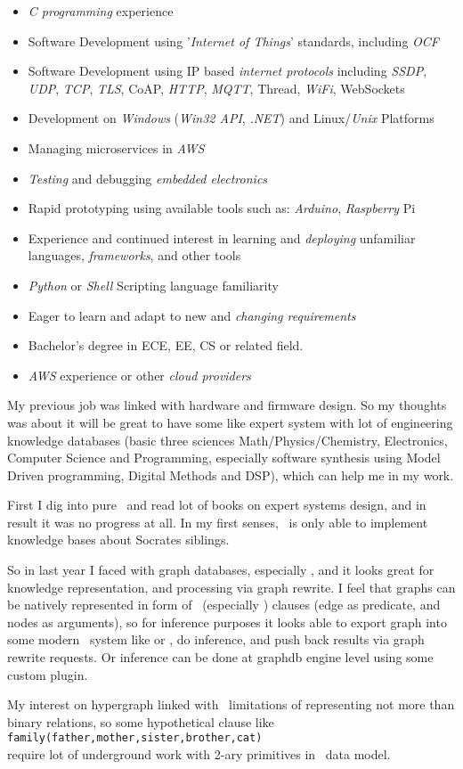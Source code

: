 \begin{framed}\noindent
\begin{itemize}[nosep,leftmargin=*]
\item \emph{C programming} experience
\item Software Development using '\emph{Internet of Things}' standards, including \emph{OCF}
\item Software Development using IP based \emph{internet protocols} including \emph{SSDP}, \emph{UDP}, \emph{TCP}, \emph{TLS}, CoAP, \emph{HTTP}, \emph{MQTT}, Thread, \emph{WiFi}, WebSockets
\item Development on \emph{Windows} (\emph{Win32 API}, \emph{.NET}) and Linux/\emph{Unix} Platforms
\item Managing microservices in \emph{AWS}
\item \emph{Testing} and debugging \emph{embedded electronics}
\item Rapid prototyping using available tools such as: \emph{Arduino}, \emph{Raspberry} Pi
\item Experience and continued interest in learning and \emph{deploying} unfamiliar languages, \emph{frameworks}, and other tools
\item \emph{Python} or \emph{Shell} Scripting language familiarity
\item Eager to learn and adapt to new and \emph{changing requirements}
\item Bachelor's degree in ECE, EE, CS or related field.
\item \emph{AWS} experience or other \emph{cloud providers}
\end{itemize}
\end{framed}

My previous job was linked with hardware and firmware design. So my thoughts was
about it will be great to have some  like expert system with
lot of engineering knowledge databases (basic three sciences
Math/Physics/Chemistry, Electronics, Computer Science and Programming,
especially software synthesis using Model Driven programming, Digital Methods
and DSP), which can help me in my work.

First I dig into pure \prolog\ and read lot of books on expert systems design,
and in result it was no progress at all. In my first senses, \prolog\ is only
able to implement knowledge bases about Socrates siblings.

So in last year I faced with graph databases, especially \neo, and it looks
great for knowledge representation, and processing via graph rewrite. I feel
that graphs can be natively represented in form of \prolog\ (especially
) clauses (edge as
predicate, and nodes as arguments), so for inference purposes it looks able to
export graph into some modern \prolog\ system like
 or \xsb, do inference,
and push back results via graph rewrite requests. Or inference can be done at
graphdb engine level using some custom plugin.

My interest on hypergraph linked with \neo\ limitations of representing not more
than binary relations, so some hypothetical clause like
\\\verb|family(father,mother,sister,brother,cat)|\\ require lot of underground
work with 2-ary primitives in \neo\ data model.
